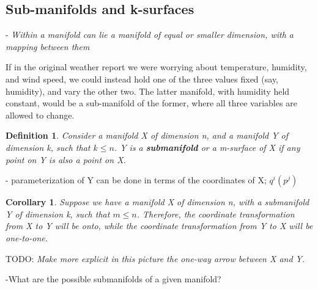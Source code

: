 \documentclass{book}
\newtheorem{defn}[equation]{Definition}
\newtheorem{coro}[equation]{Corollary}
\begin{document}
\subsection{Sub-manifolds and k-surfaces}

- \emph{Within a manifold can lie a manifold of equal or smaller dimension, with a mapping between them}

If in the original weather report we were worrying about temperature, humidity, and wind speed, we could instead hold one of the three values fixed (say, humidity), and vary the other two. The latter manifold, with humidity held constant, would be a sub-manifold of the former, where all three variables are allowed to change.  



\begin{defn}
	Consider a manifold X of dimension n, and a manifold Y of dimension k, such that $k \leq n$. Y is a \textbf{submanifold} or a m-surface of X if any point on Y is also a point on X. 
\end{defn}

- parameterization of Y can be done in terms of the coordinates of X; $q^i(p^j)$



\begin{coro}
	Suppose we have a manifold X of dimension n, with a submanifold Y of dimension k, such that $m \leq n$. Therefore, the coordinate transformation from X to Y will be onto, while the coordinate transformation from Y to X will be one-to-one. 
\end{coro}


TODO: \emph{Make more explicit in this picture the one-way arrow between X and Y.}


-What are the possible submanifolds of a given manifold?
\end{document}
